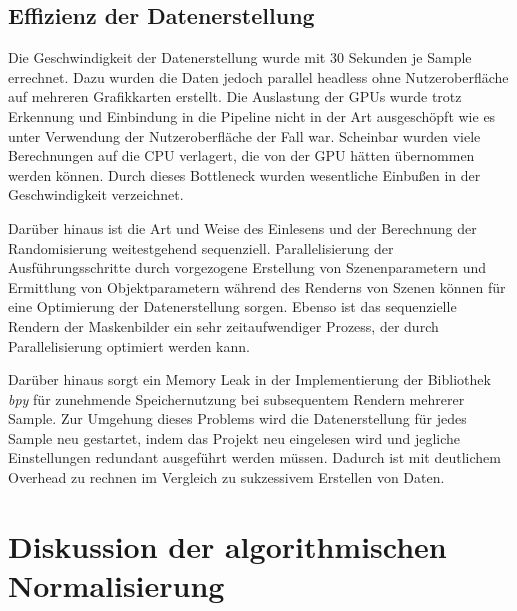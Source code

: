\subsection{Effizienz der Datenerstellung}

Die Geschwindigkeit der Datenerstellung wurde mit 30 Sekunden je Sample errechnet. Dazu wurden die Daten jedoch parallel headless ohne Nutzeroberfläche auf mehreren Grafikkarten erstellt. Die Auslastung der GPUs wurde trotz Erkennung und Einbindung in die Pipeline nicht in der Art ausgeschöpft wie es unter Verwendung der Nutzeroberfläche der Fall war. Scheinbar wurden viele Berechnungen auf die CPU verlagert, die von der GPU hätten übernommen werden können. Durch dieses Bottleneck wurden wesentliche Einbußen in der Geschwindigkeit verzeichnet.

Darüber hinaus ist die Art und Weise des Einlesens und der Berechnung der Randomisierung weitestgehend sequenziell. Parallelisierung der Ausführungsschritte durch vorgezogene Erstellung von Szenenparametern und Ermittlung von Objektparametern während des Renderns von Szenen können für eine Optimierung der Datenerstellung sorgen. Ebenso ist das sequenzielle Rendern der Maskenbilder ein sehr zeitaufwendiger Prozess, der durch Parallelisierung optimiert werden kann.

Darüber hinaus sorgt ein Memory Leak in der Implementierung der Bibliothek \textit{bpy} für zunehmende Speichernutzung bei subsequentem Rendern mehrerer Sample. Zur Umgehung dieses Problems wird die Datenerstellung für jedes Sample neu gestartet, indem das Projekt neu eingelesen wird und jegliche Einstellungen redundant ausgeführt werden müssen. Dadurch ist mit deutlichem Overhead zu rechnen im Vergleich zu sukzessivem Erstellen von Daten.




\section{Diskussion der algorithmischen Normalisierung}
\label{sec:diskussion:cv}

